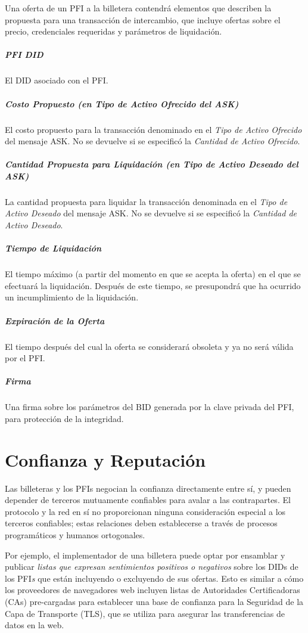 \documentclass[11pt]{article}
\begin{document}
Una oferta de un PFI a la billetera contendrá elementos que describen la propuesta para una transacción de intercambio, que incluye ofertas sobre el precio, credenciales requeridas y parámetros de liquidación. 

\subparagraph{PFI DID}

El DID asociado con el PFI. 

\subparagraph{Costo Propuesto (en Tipo de Activo Ofrecido del ASK)}

El costo propuesto para la transacción denominado en el \textit{Tipo de Activo Ofrecido} del mensaje ASK. No se devuelve si se especificó la \textit{Cantidad de Activo Ofrecido}. 

\subparagraph{Cantidad Propuesta para Liquidación (en Tipo de Activo Deseado del ASK)}

La cantidad propuesta para liquidar la transacción denominada en el \textit{Tipo de Activo Deseado} del mensaje ASK. No se devuelve si se especificó la \textit{Cantidad de Activo Deseado}. 

\subparagraph{Tiempo de Liquidación}

El tiempo máximo (a partir del momento en que se acepta la oferta) en el que se efectuará la liquidación. Después de este tiempo, se presupondrá que ha ocurrido un incumplimiento de la liquidación. 

\subparagraph{Expiración de la Oferta}

El tiempo después del cual la oferta se considerará obsoleta y ya no será válida por el PFI. 

\subparagraph{Firma}

Una firma sobre los parámetros del BID generada por la clave privada del PFI, para protección de la integridad. 

\vspace{2\baselineskip}
\section{Confianza y Reputación}


\vspace{1\baselineskip}
Las billeteras y los PFIs negocian la confianza directamente entre sí, y pueden depender de terceros mutuamente confiables para avalar a las contrapartes. El protocolo y la red en sí no proporcionan ninguna consideración especial a los terceros confiables; estas relaciones deben establecerse a través de procesos programáticos y humanos ortogonales.

\vspace{1\baselineskip}
Por ejemplo, el implementador de una billetera puede optar por ensamblar y publicar \textit{listas que expresan sentimientos positivos o negativos} sobre los DIDs de los PFI\textit{s } que están incluyendo o excluyendo de sus ofertas. Esto es similar a cómo los proveedores de navegadores web incluyen listas de Autoridades Certificadoras (CAs) pre-cargadas para establecer una base de confianza para la Seguridad de la Capa de Transporte (TLS), que se utiliza para asegurar las transferencias de datos en la web.
\end{document}
